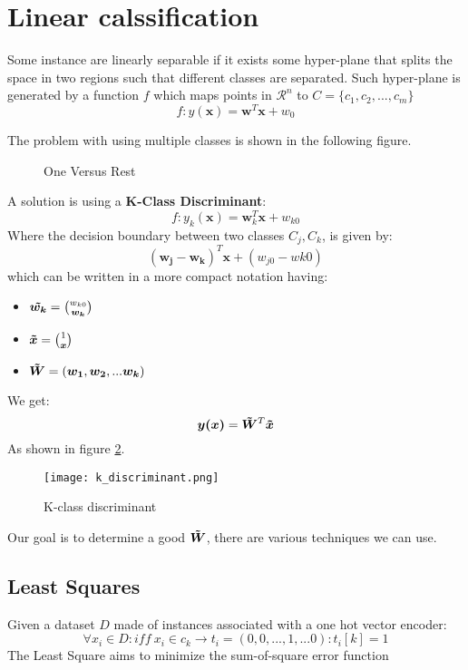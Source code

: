 


\section{Linear calssification}
Some instance are linearly separable if it exists some hyper-plane that splits the space in two regions such that different classes are separated. Such hyper-plane is generated by a function $f$ which maps points in $\mathcal{R}^n$ to $C=\lbrace c_1,c_2,...,c_m\rbrace$
\[f: y(\bm{x})=\bm{w}^T\bm{x}+w_0\]


The problem with using multiple classes is shown in the following figure.


\begin{figure}[H]
    \centering
    \qquad

\caption{One Versus Rest }
\label{fig:linear_problem}

\end{figure}


A solution is using a \textbf{K-Class Discriminant}:
\[f: y_k(\bm{x})=\bm{w}_k^T\bm{x}+w_{k0}\]
Where the decision boundary between two classes $C_j,C_k$, is given by:
\[(\bm{w_j}-\bm{w_k})^T\bm{x}+(w_{j0}-w{k0})\]
which can be written in a more compact notation having:
\begin{itemize}
\item $\bm{\tilde{w_k}}=\binom{w_{k0}}{\bm{w_k}}$
\item $\bm{\tilde{x}}=\binom{1}{\bm{x}}$
\item $\bm{\tilde{W}}=(\bm{w_1},\bm{w_2},...\bm{w_k})$
\end{itemize}
We get:
\[\bm{y(x)}=\bm{\tilde{W}}^T\bm{\tilde{x}}\]
As shown in figure \ref{fig:k_discriminant}.

\begin{figure}[H]
\texttt{[image: k\_discriminant.png]}
\caption{K-class discriminant}
\label{fig:k_discriminant}
\end{figure}

Our goal is to determine a good $\bm{\tilde{W}}$, there are various techniques we can use.

\subsection{Least Squares}
Given a dataset $D$ made of instances associated with a one hot vector encoder:
\[\forall x_i \in D: iff\ x_i \in c_k \rightarrow t_i=(0,0,...,1,...0): t_i[k]=1\]
The Least Square aims to minimize the sum-of-square error function


